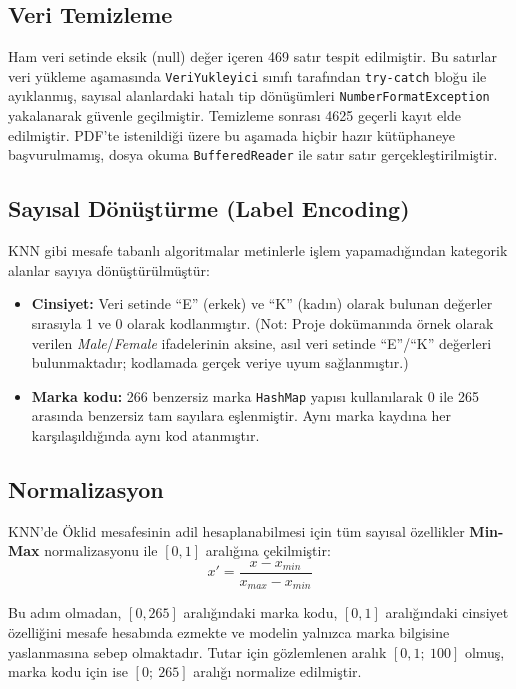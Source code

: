 \documentclass[conference]{IEEEtran}
\begin{document}
\subsection{Veri Temizleme}

Ham veri setinde eksik (null) değer içeren 469 satır tespit edilmiştir. Bu satırlar veri yükleme aşamasında \texttt{VeriYukleyici} sınıfı tarafından \texttt{try-catch} bloğu ile ayıklanmış, sayısal alanlardaki hatalı tip dönüşümleri \texttt{NumberFormatException} yakalanarak güvenle geçilmiştir. Temizleme sonrası 4625 geçerli kayıt elde edilmiştir. PDF'te istenildiği üzere bu aşamada hiçbir hazır kütüphaneye başvurulmamış, dosya okuma \texttt{BufferedReader} ile satır satır gerçekleştirilmiştir.

\subsection{Sayısal Dönüştürme (Label Encoding)}

KNN gibi mesafe tabanlı algoritmalar metinlerle işlem yapamadığından kategorik alanlar sayıya dönüştürülmüştür:
\begin{itemize}
    \item \textbf{Cinsiyet:} Veri setinde ``E'' (erkek) ve ``K'' (kadın) olarak bulunan değerler sırasıyla 1 ve 0 olarak kodlanmıştır. (Not: Proje dokümanında örnek olarak verilen \emph{Male}/\emph{Female} ifadelerinin aksine, asıl veri setinde ``E''/``K'' değerleri bulunmaktadır; kodlamada gerçek veriye uyum sağlanmıştır.)
    \item \textbf{Marka kodu:} 266 benzersiz marka \texttt{HashMap} yapısı kullanılarak 0 ile 265 arasında benzersiz tam sayılara eşlenmiştir. Aynı marka kaydına her karşılaşıldığında aynı kod atanmıştır.
\end{itemize}

\subsection{Normalizasyon}

KNN'de Öklid mesafesinin adil hesaplanabilmesi için tüm sayısal özellikler \textbf{Min-Max} normalizasyonu ile $[0, 1]$ aralığına çekilmiştir:
\begin{equation}
x' = \frac{x - x_{min}}{x_{max} - x_{min}}
\end{equation}

Bu adım olmadan, $[0, 265]$ aralığındaki marka kodu, $[0, 1]$ aralığındaki cinsiyet özelliğini mesafe hesabında ezmekte ve modelin yalnızca marka bilgisine yaslanmasına sebep olmaktadır. Tutar için gözlemlenen aralık $[0{,}1;\ 100]$ olmuş, marka kodu için ise $[0;\ 265]$ aralığı normalize edilmiştir.
\end{document}
